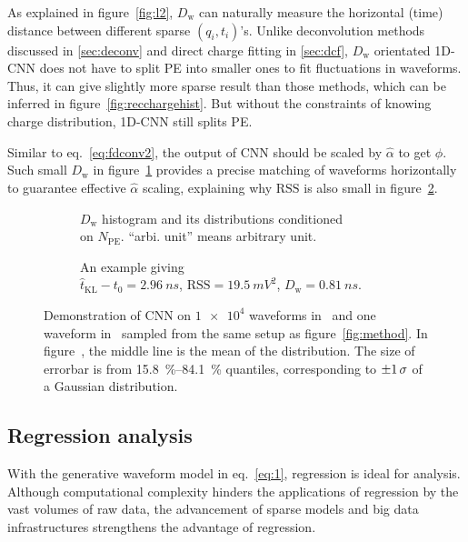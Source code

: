 As explained in figure~\ref{fig:l2}, $D_\mathrm{w}$ can naturally measure the horizontal (time) distance between different sparse $({q}_i,{t}_i)$'s. Unlike deconvolution methods discussed in \ref{sec:deconv} and direct charge fitting in \ref{sec:dcf}, $D_\mathrm{w}$ orientated 1D-CNN does not have to split PE into smaller ones to fit fluctuations in waveforms. Thus, it can give slightly more sparse result than those methods, which can be inferred in figure~\ref{fig:recchargehist}. But without the constraints of knowing charge distribution, 1D-CNN still splits PE.

Similar to eq.~\eqref{eq:fdconv2}, the output of CNN should be scaled by $\hat{\alpha}$ to get $\hat{\phi}$. Such small $D_\mathrm{w}$ in figure~\ref{fig:cnn-npe} provides a precise matching of waveforms horizontally to guarantee effective $\hat{\alpha}$ scaling, explaining why $\mathrm{RSS}$ is also small in figure~\ref{fig:cnn}.

\begin{figure}[H]
  \begin{subfigure}{.5\textwidth}
    \centering
    \resizebox{\textwidth}{!}{}
    \caption{\label{fig:cnn-npe} $D_\mathrm{w}$ histogram and its distributions conditioned \\ on $N_{\mathrm{PE}}$. ``arbi. unit'' means arbitrary unit.}
  \end{subfigure}
  \begin{subfigure}{.5\textwidth}
    \centering
    \resizebox{\textwidth}{!}{}
    \caption{\label{fig:cnn}An example giving \\ $\hat{t}_\mathrm{KL} - t_0=\SI{2.96}{ns}$, $\mathrm{RSS}=\SI{19.5}{mV^2}$, $D_\mathrm{w}=\SI{0.81}{ns}$.}
  \end{subfigure}
  \caption{\label{fig:cnn-performance}Demonstration of CNN on $\num[retain-unity-mantissa=false]{1e4}$ waveforms in~ and one waveform in~ sampled from the same setup as figure~\ref{fig:method}. In figure~, the middle line is the mean of the distribution. The size of errorbar is from \SIrange{15.8}{84.1}{\percent} quantiles, corresponding to $\SI{\pm 1}{\sigma}$ of a Gaussian distribution. }
\end{figure}

\subsection{Regression analysis}
\label{sec:regression}
With the generative waveform model in eq.~\eqref{eq:1}, regression is ideal for analysis. Although computational complexity hinders the applications of regression by the vast volumes of raw data, the advancement of sparse models and big data infrastructures strengthens the advantage of regression.

